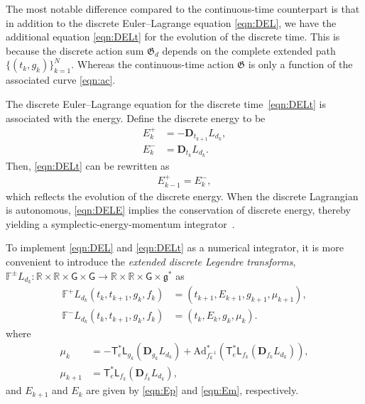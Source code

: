 \documentclass[letterpaper, 10pt, conference]{ieeeconf}
\newcommand{\G}{\ensuremath{\mathsf{G}}}
\newcommand{\T}{\ensuremath{\mathsf{T}}}
\renewcommand{\L}{\ensuremath{\mathsf{L}}}
\renewcommand{\Re}{\ensuremath{\mathbb{R}}}
\newcommand{\D}{\ensuremath{\mathbf{D}}}
\newcommand{\Ad}{\ensuremath{\mathrm{Ad}}}
\newcommand{\g}{\ensuremath{\mathfrak{g}}}
\begin{document}
The most notable difference compared to the continuous-time counterpart is that in addition to the discrete Euler--Lagrange equation \eqref{eqn:DEL}, we have the additional equation \eqref{eqn:DELt} for the evolution of the discrete time. 
This is because the discrete action sum $\mathfrak{G}_d$ depends on the complete extended path $\{(t_k,g_k)\}_{k=1}^N$.
Whereas the continuous-time action $\mathfrak{G}$ is only a function of the associated curve \eqref{eqn:ac}.

The discrete Euler--Lagrange equation for the discrete time~\eqref{eqn:DELt} is associated with the energy.
Define the discrete energy to be
\begin{align}
    E^+_k &= - \D_{t_{k+1}} L_{d_k},\label{eqn:Ep}\\
    E^-_k &= \D_{t_{k}} L_{d_k}.\label{eqn:Em}
\end{align}
Then, \eqref{eqn:DELt} can be rewritten as
\begin{align}
    E^+_{k-1} = E^-_k,\label{eqn:DELE}
\end{align}
which reflects the evolution of the discrete energy. 
When the discrete Lagrangian is autonomous, \eqref{eqn:DELE} implies the conservation of discrete energy, thereby yielding a symplectic-energy-momentum integrator~\cite{KaMaOr1999}.


To implement \eqref{eqn:DEL} and \eqref{eqn:DELt} as a numerical integrator, it is more convenient to introduce the \textit{extended discrete Legendre transforms}, $\mathbb{F}^\pm L_{d_k}: \Re\times\Re \times \G \times \G \rightarrow \Re\times \Re\times\G\times\g^*$ as
\begin{align}
    \mathbb{F}^+ L_{d_k} (t_k,t_{k+1}, g_k,f_k) & = (t_{k+1}, E_{k+1}, g_{k+1}, \mu_{k+1}),\\
    \mathbb{F}^- L_{d_k} (t_k,t_{k+1}, g_k,f_k) & = (t_k, E_k, g_{k}, \mu_{k}).
\end{align}
where
\begin{align}
    \mu_k & = -\T^*_e\L_{g_k}(\D_{g_k} L_{d_k})+ \Ad^*_{f_k^{-1}} (\T^*_e\L_{f_k}(\D_{f_k} L_{d_k})),\label{eqn:muk}\\
    \mu_{k+1} & = \T^*_e\L_{f_k} (\D_{f_k} L_{d_k}),\label{eqn:mukp}
\end{align}
and $E_{k+1}$ and $E_k$ are given by \eqref{eqn:Ep} and \eqref{eqn:Em}, respectively. 
\end{document}
